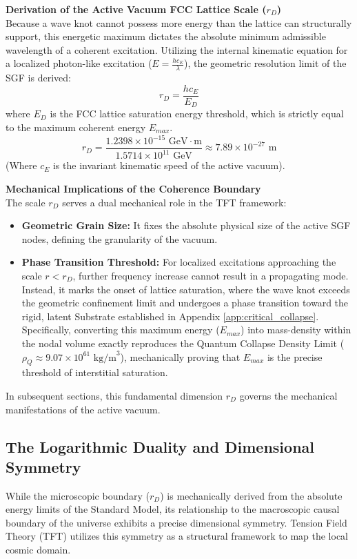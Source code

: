 \textbf{Derivation of the Active Vacuum FCC Lattice Scale ($r_D$)}\\
Because a wave knot cannot possess more energy than the lattice can structurally support, this energetic maximum dictates the absolute minimum admissible wavelength of a coherent excitation. Utilizing the internal kinematic equation for a localized photon-like excitation ($E = \frac{h c_E}{\lambda}$), the geometric resolution limit of the SGF is derived:
\begin{equation}
    r_D = \frac{h c_E}{E_D} 
\end{equation}
where $E_D$ is the FCC lattice saturation energy threshold, which is strictly equal to the maximum coherent energy $E_{max}$.
\begin{equation}
    r_D = \frac{1.2398 \times 10^{-15} \text{ GeV} \cdot \text{m}}{1.5714 \times 10^{11} \text{ GeV}} \approx 7.89 \times 10^{-27} \text{ m}
\end{equation}
(Where $c_E$ is the invariant kinematic speed of the active vacuum).

\textbf{Mechanical Implications of the Coherence Boundary}\\
The scale $r_D$ serves a dual mechanical role in the TFT framework:
\begin{itemize}
    \item \textbf{Geometric Grain Size:} It fixes the absolute physical size of the active SGF nodes, defining the granularity of the vacuum.
    \item \textbf{Phase Transition Threshold:} For localized excitations approaching the scale $r < r_D$, further frequency increase cannot result in a propagating mode. Instead, it marks the onset of lattice saturation, where the wave knot exceeds the geometric confinement limit and undergoes a phase transition toward the rigid, latent Substrate established in Appendix \ref{app:critical_collapse}. Specifically, converting this maximum energy ($E_{max}$) into mass-density within the nodal volume exactly reproduces the Quantum Collapse Density Limit ($\rho_Q \approx 9.07 \times 10^{61} \text{ kg/m}^3$), mechanically proving that $E_{max}$ is the precise threshold of interstitial saturation.
\end{itemize}
In subsequent sections, this fundamental dimension $r_D$ governs the mechanical manifestations of the active vacuum.


\subsection{The Logarithmic Duality and Dimensional Symmetry}
\label{sec:logarithmic_duality}
While the microscopic boundary ($r_D$) is mechanically derived from the absolute energy limits of the Standard Model, its relationship to the macroscopic causal boundary of the universe exhibits a precise dimensional symmetry. Tension Field Theory (TFT) utilizes this symmetry as a structural framework to map the local cosmic domain.

